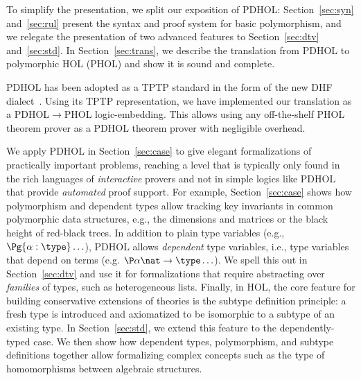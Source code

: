 To simplify the presentation, we split our exposition of PDHOL:
Section~\ref{sec:syn} and~\ref{sec:rul} present the syntax and proof system for basic polymorphism, and we relegate the presentation of two advanced features to Section~\ref{sec:dtv} and~\ref{sec:std}.
In Section~\ref{sec:trans}, we describe the translation from PDHOL to polymorphic HOL (PHOL) and show it is sound and complete.

PDHOL has been adopted as a TPTP standard in the form of the new DHF dialect~\cite{R+25}.
Using its TPTP representation, we have implemented our translation as a PDHOL$\to$PHOL logic-embedding.
This allows using any off-the-shelf PHOL theorem prover as a PDHOL theorem prover with negligible overhead.

We apply PDHOL in Section~\ref{sec:case} to give elegant formalizations of practically important problems, reaching a level that is typically only found in the rich languages of \emph{interactive} provers and not in simple logics like PDHOL that provide \emph{automated} proof support.
For example, Section~\ref{sec:case} shows how polymorphism and dependent types allow tracking key invariants in common polymorphic data structures, e.g., the dimensions and matrices or the black height of red-black trees.
In addition to plain type variables (e.g., $\Pg{\alpha:\type}\ldots$), PDHOL allows \emph{dependent} type variables, i.e., type variables that depend on terms (e.g. $\P\alpha{\nat\to\type}\ldots$).
We spell this out in Section~\ref{sec:dtv} and use it for formalizations that require abstracting over \emph{families} of types, such as heterogeneous lists.
Finally, in HOL, the core feature for building conservative extensions of theories is the subtype definition principle: a fresh type is introduced and axiomatized to be isomorphic to a subtype of an existing type.
In Section~\ref{sec:std}, we extend this feature to the dependently-typed case.
We then show how dependent types, polymorphism, and subtype definitions together allow formalizing complex concepts such as the type of homomorphisms between algebraic structures.


